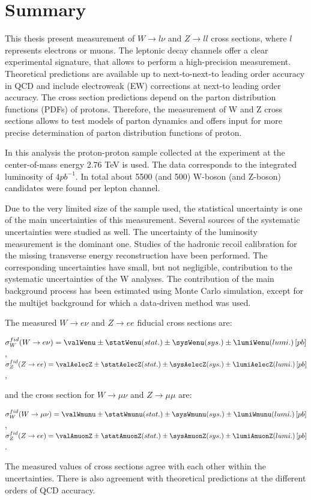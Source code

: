 \chapter{Summary}

This thesis present measurement of  $W\to l\nu$ and $Z\to ll$ cross sections, where $l$ represents electrons or muons. The leptonic decay channels offer a clear experimental signature, that allows to perform a high-precision measurement. Theoretical predictions are available up to next-to-next-to leading order accuracy in QCD and include electroweak (EW) corrections at next-to leading order accuracy. The cross section predictions depend on the parton distribution functions (PDFs) of protons. Therefore, the measurement of W and Z cross sections allows to test models of parton dynamics and offers input for more precise determination of parton distribution functions of proton.

In this analysis the proton-proton sample collected at the \atlas experiment at the center-of-mass energy 2.76 TeV is used. The data corresponds to the integrated luminosity of $4pb^{-1}$. In total about 5500 (and 500) W-boson (and Z-boson) candidates were found per lepton channel.

Due to the very limited size of the sample used, the statistical uncertainty is one of the main uncertainties of this measurement. Several sources of the systematic uncertainties were studied as well. The uncertainty of the luminosity measurement is the dominant one. Studies of the hadronic recoil calibration for the missing transverse energy reconstruction have been performed. The corresponding uncertainties have small, but not negligible, contribution to the systematic uncertainties of the W analyses. The contribution of the main background process has been estimated using Monte Carlo simulation, except for the multijet background for which a data-driven method was used.

The measured $W\to e\nu$ and $Z\to ee$ fiducial cross sections are:
\begin{center}
$\sigma^{fid}_{W}(\wenu) = \valWenu  \pm \statWenu (stat.) \pm \sysWenu (sys.) \pm \lumiWenu (lumi.) \, [pb]$,\\
$\sigma^{fid}_{Z}(Z\to ee) = \valAelecZ  \pm \statAelecZ (stat.) \pm \sysAelecZ (sys.) \pm \lumiAelecZ (lumi.) \, [pb]$,\\
\end{center}
and the cross section for $W\to \mu\nu$ and $Z\to \mu \mu $ are:
\begin{center}
$\sigma^{fid}_{W}(\wmunu) = \valWmunu  \pm \statWmunu (stat.) \pm \sysWmunu (sys.) \pm \lumiWmunu (lumi.) \, [pb]$,\\
$\sigma^{fid}_{Z}(Z\to ee) = \valAmuonZ  \pm \statAmuonZ (stat.) \pm \sysAmuonZ (sys.) \pm \lumiAmuonZ (lumi.) \, [pb]$.\\
\end{center}
The measured values of cross sections agree with each other within the uncertainties. There is also agreement with theoretical predictions at the different orders of QCD accuracy.

